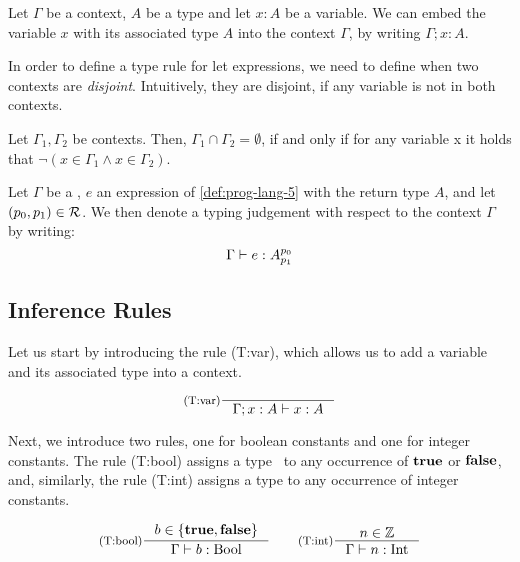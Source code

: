 \begin{definition}\label{def:context-augment}
   Let \(\Gamma\) be a context, \(A\) be a type and let \(x : A\) be a variable. We can embed the variable \(x\) with its associated type \(A\) into the context \(\Gamma\),  by writing \(\Gamma ; x:A\).
\end{definition}

In order to define a type rule for let expressions, we need to define when two contexts are \emph{disjoint}. Intuitively, they are disjoint, if any variable is not in both contexts. 

\begin{definition}\label{def:disjoint-contexts}
   Let \(\Gamma_1, \Gamma_2\) be contexts. Then, \(\Gamma_1 \cap \Gamma_2 = \emptyset\), if and only if for any variable x it holds that \(\neg(x \in \Gamma_1 \wedge x \in \Gamma_2)\).
\end{definition}

\begin{definition}\label{def:type-judgement-context}
   Let \(\Gamma\) be a , \(e\) an expression of \cref{def:prog-lang-5} with the return type \(A\), and let \((p_0, p_1) \in \mathcal{R}\). We then denote a typing judgement with respect to the context \(\Gamma\) by writing:
   \[
      \Gamma \vdash e : A ^{p_0}_{p_1}
   \]
\end{definition}


\subsection{Inference Rules}\label{sec:inference-rules-letvar}

Let us start by introducing the rule (T:var), which allows us to add a variable and its associated type into a context.

\[
   \inference[(T:var)]
   {}
   {\typing{\Gamma; x: A}{x}{A}}
\]

Next, we introduce two rules, one for boolean constants and one for integer constants. The rule (T:bool) assigns a type \bool~to any occurrence of \(\mathbf{true}\) or \(\mathbf{false}\), and, similarly, the rule (T:int) assigns a type \typeint to any occurrence of integer constants.

\[
   \inference[(T:bool)]
   {b \in \{\true, \false\}}
   {\typing{\Gamma}{b}{\text{\bool}}}%
   \qquad
   \inference[(T:int)]
   {n \in \mathbb{Z}}
   {\typing{\Gamma}{n}{\text{\typeint}}}
\]

